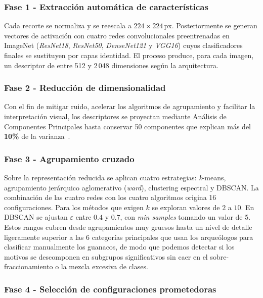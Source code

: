 \subsubsection*{Fase 1 - Extracción automática de características}

Cada recorte se normaliza y se reescala a \(224\times224\,\text{px}\).
Posteriormente se generan vectores de activación con cuatro redes convolucionales preentrenadas en ImageNet (\emph{ResNet18}, \emph{ResNet50}, \emph{DenseNet121} y \emph{VGG16}) cuyos clasificadores finales se sustituyen por capas identidad.
El proceso produce, para cada imagen, un descriptor de entre 512 y 2\,048 dimensiones según la arquitectura.

\subsubsection*{Fase 2 - Reducción de dimensionalidad}

Con el fin de mitigar ruido, acelerar los algoritmos de agrupamiento y facilitar la interpretación visual, los descriptores se proyectan mediante Análisis de Componentes Principales hasta conservar 50 componentes que explican más del \textbf{10\%} de la varianza~\cite{jolliffe2016principal}.

\subsubsection*{Fase 3 - Agrupamiento cruzado}

Sobre la representación reducida se aplican cuatro estrategias: \emph{k}-means, agrupamiento jerárquico aglomerativo (\emph{ward}), clustering espectral y DBSCAN.
La combinación de las cuatro redes con los cuatro algoritmos origina 16 configuraciones.
Para los métodos que exigen \(k\) se exploran valores de \(2\) a \(10\). En DBSCAN se ajustan \(\varepsilon\) entre \(0.4\) y \(0.7\), con \textit{min samples} tomando un valor de 5.
Estos rangos cubren desde agrupamientos muy gruesos hasta un nivel de detalle ligeramente superior a las 6 categorías principales que usan los arqueólogos para clasificar manualmente los guanacos, de modo que podemos detectar si los motivos se descomponen en subgrupos significativos sin caer en el sobre-fraccionamiento o la mezcla excesiva de clases.

\subsubsection*{Fase 4 - Selección de configuraciones prometedoras}

